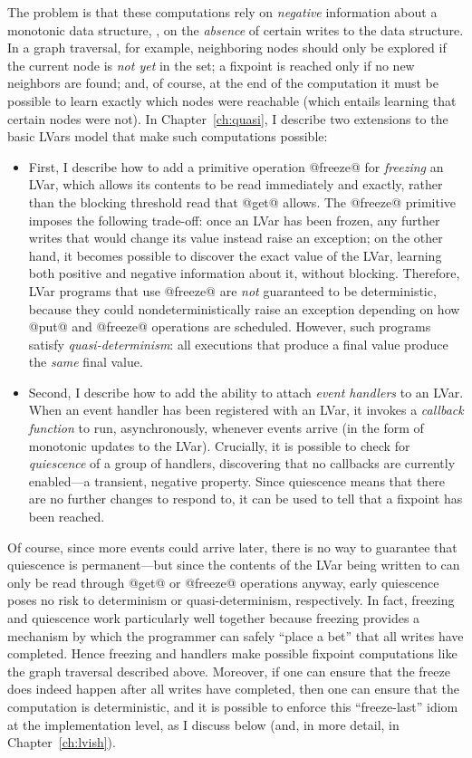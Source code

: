 The problem is that these computations rely on \emph{negative}
information about a monotonic data structure, \ie, on the
\emph{absence} of certain writes to the data structure.  In a graph
traversal, for example, neighboring nodes should only be explored if
the current node is \emph{not yet} in the set; a fixpoint is reached
only if no new neighbors are found; and, of course, at the end of the
computation it must be possible to learn exactly which nodes were
reachable (which entails learning that certain nodes were not).  In
Chapter~\ref{ch:quasi}, I describe two extensions to the basic LVars
model that make such computations possible:
\begin{itemize}
\item First, I describe how to add a primitive operation @freeze@ for
  \emph{freezing} an LVar, which allows its contents to be read
  immediately and exactly, rather than the blocking threshold read
  that @get@ allows.  The @freeze@ primitive imposes the following
  trade-off: once an LVar has been frozen, any further writes that
  would change its value instead raise an exception; on the other
  hand, it becomes possible to discover the exact value of the LVar,
  learning both positive and negative information about it, without
  blocking.  Therefore, LVar programs that use @freeze@ are \emph{not}
  guaranteed to be deterministic, because they could
  nondeterministically raise an exception depending on how @put@ and
  @freeze@ operations are scheduled.  However, such programs satisfy
  \emph{quasi-determinism}: all executions that produce a final value
  produce the \emph{same} final value.
\item Second, I describe how to add the ability to attach \emph{event
  handlers} to an LVar.  When an event handler has been registered
  with an LVar, it invokes a \emph{callback function} to run,
  asynchronously, whenever events arrive (in the form of monotonic
  updates to the LVar).  Crucially, it is possible to check for
  \emph{quiescence} of a group of handlers, discovering that no
  callbacks are currently enabled---a transient, negative property.
  Since quiescence means that there are no further changes to respond
  to, it can be used to tell that a fixpoint has been reached.
\end{itemize}
Of course, since more events could arrive later, there is no way to
guarantee that quiescence is permanent---but since the contents of the
LVar being written to can only be read through @get@ or @freeze@
operations anyway, early quiescence poses no risk to determinism or
quasi-determinism, respectively.  In fact, freezing and quiescence
work particularly well together because freezing provides a mechanism
by which the programmer can safely ``place a bet'' that all writes
have completed.  Hence freezing and handlers make possible fixpoint
computations like the graph traversal described above.  Moreover, if
one can ensure that the freeze does indeed happen after all writes
have completed, then one can ensure that the computation is
deterministic, and it is possible to enforce this ``freeze-last''
idiom at the implementation level, as I discuss below (and, in more
detail, in Chapter~\ref{ch:lvish}).

